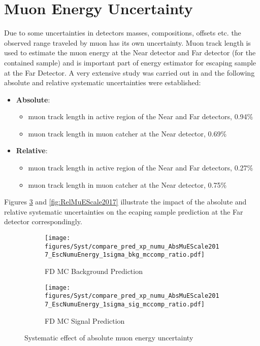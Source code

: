 \section{Muon Energy Uncertainty}
Due to some uncertainties in detectors masses, compositions, offsets etc. the observed range traveled by muon has its own 
uncertainty. Muon track length is used to estimate the muon energy at the Near detector and Far detector (for the contained 
sample) and is important part of energy estimator for escaping sample at the Far Detector. A very extensive study was carried out
in \cite{muonEUnc_technote} and the following absolute and relative systematic uncertainties were established:
\begin{itemize}
\item \textbf{Absolute}: 
\begin{itemize}
	\item muon track length in active region of the Near and Far detectors, 0.94\%
	\item muon track length in muon catcher at the Near detector, 0.69\%
\end{itemize}
\item \textbf{Relative}:
\begin{itemize}
        \item muon track length in active region of the Near and Far detectors, 0.27\%
        \item muon track length in muon catcher at the Near detector, 0.75\%
\end{itemize}
\end{itemize}

Figures \ref{fig:AbsMuEScale2017} and \ref{fig:RelMuEScale2017} illustrate the impact of the absolute and relative systematic 
uncertainties on the ecaping sample prediction at the Far detector correspondingly.

\clearpage
\begin{figure}[t!]
\begin{subfigure}[t]{0.5\textwidth}
  \centering
  \texttt{[image: figures/Syst/compare\_pred\_xp\_numu\_AbsMuEScale2017\_EscNumuEnergy\_1sigma\_bkg\_mccomp\_ratio.pdf]}
  \caption{FD MC Background Prediction}
  \label{fig:bkg_AbsMuEScale2017}
\end{subfigure}%
\begin{subfigure}[t]{0.5\textwidth}
  \centering
  \texttt{[image: figures/Syst/compare\_pred\_xp\_numu\_AbsMuEScale2017\_EscNumuEnergy\_1sigma\_sig\_mccomp\_ratio.pdf]}
  \caption{FD MC Signal Prediction}
  \label{fig:sig_AbsMuEScale2017}
\end{subfigure}
\caption{ Systematic effect of absolute muon energy uncertainty }
\label{fig:AbsMuEScale2017}
\end{figure}

